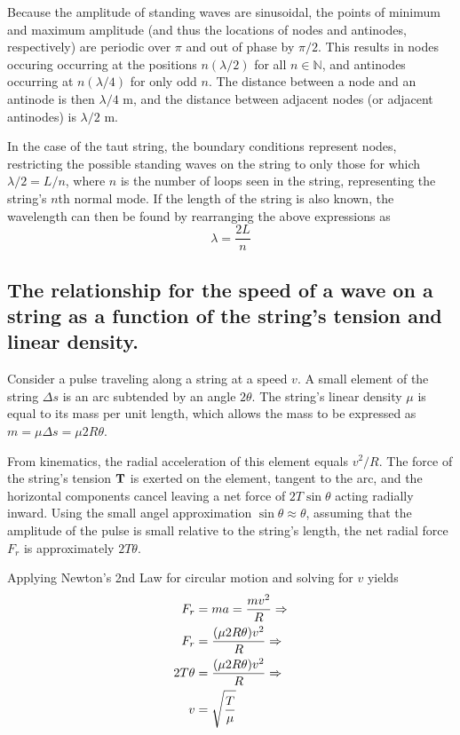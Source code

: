 \documentclass[twocolumn,english]{IEEEtran}
\theoremstyle{plain}
\theoremstyle{plain}
\begin{document}
Because the amplitude of standing waves are sinusoidal, the points of minimum and maximum amplitude (and thus the locations of nodes and antinodes, respectively) are periodic over $\pi$ and out of phase by $\pi/2$. This results in nodes occuring occurring at the positions $n(\lambda/2)$ for all $n \in \mathbb{N}$, and antinodes occurring at $n(\lambda/4)$ for only odd $n$. The distance between a node and an antinode is then $\lambda/4$ m, and the distance between adjacent nodes (or adjacent antinodes) is $\lambda/2$ m.

In the case of the taut string, the boundary conditions represent nodes, restricting the possible standing waves on the string to only those for which $\lambda/2 = L/n$, where $n$ is the number of loops seen in the string, representing the string's $n$th normal mode. If the length of the string is also known, the wavelength can then be found by rearranging the above expressions as
\begin{equation}\label{eq:p1_wavelength}
 \lambda = \frac{2L}{n}
\end{equation}

\subsection*{The relationship for the speed of a wave on a string as a function of the string's tension and linear density.}
Consider a pulse traveling along a string at a speed $v$. A small element of the string $\Delta s$ is an arc subtended by an angle $2\theta$. The string's linear density $\mu$ is equal to its mass per unit length, which allows the mass to be expressed as $m = \mu\Delta s = \mu 2R\theta$.

From kinematics, the radial acceleration of this element equals $v^2/R$. The force of the string's tension $\bf{T}$ is exerted on the element, tangent to the arc, and the horizontal components cancel leaving a net force of $2T\sin\theta$ acting radially inward. Using the small angel approximation $\sin\theta \approx \theta$, assuming that the amplitude of the pulse is small relative to the string's length, the net radial force $F_r$ is approximately $2T\theta$.

Applying Newton's 2nd Law for circular motion and solving for $v$ yields
\begin{align}\label{eq:v.eq.t.mu}
 F_r &= ma = \frac{mv^2}{R} \Rightarrow \notag \\
 F_r &= \frac{(\mu 2R\theta)v^2}{R}  \Rightarrow \notag \\
 2T\theta &= \frac{(\mu 2R\theta)v^2}{R} \Rightarrow \notag \\
 v &= \sqrt{\frac{T}{\mu}}
\end{align}
\end{document}
